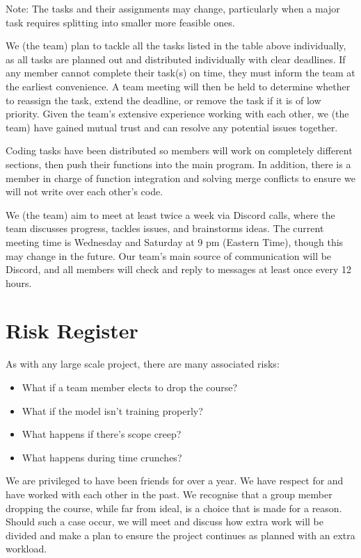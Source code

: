 \documentclass{article} %
\begin{document}
\FloatBarrier

Note: The tasks and their assignments may change, particularly when a major task requires splitting into smaller more feasible ones. 

We (the team) plan to tackle all the tasks listed in the table above individually, as all tasks are planned out and distributed individually with clear deadlines. If any member cannot complete their task(s) on time, they must inform the team at the earliest convenience. A team meeting will then be held to determine whether to reassign the task, extend the deadline, or remove the task if it is of low priority. Given the team’s extensive experience working with each other, we (the team) have gained mutual trust and can resolve any potential issues together.

Coding tasks have been distributed so members will work on completely different sections, then push their functions into the main program. In addition, there is a member in charge of function integration and solving merge conflicts to ensure we will not write over each other's code.

We (the team) aim to meet at least twice a week via Discord calls, where the team discusses progress, tackles issues, and brainstorms ideas. The current meeting time is Wednesday and Saturday at 9 pm (Eastern Time), though this may change in the future. Our team's main source of communication will be Discord, and all members will check and reply to messages at least once every 12 hours.


\section{Risk Register}
As with any large scale project, there are many associated risks:

\begin{itemize}
  \item What if a team member elects to drop the course?
  \item What if the model isn't training properly?
  \item What happens if there's scope creep?
  \item What happens during time crunches?
\end{itemize}

We are privileged to have been friends for over a year. We have respect for and have worked with each other in the past. We recognise that a group member dropping the course, while far from ideal, is a choice that is made for a reason. Should such a case occur, we will meet and discuss how extra work will be divided and make a plan to ensure the project continues as planned with an extra workload.
\end{document}
